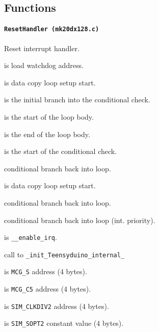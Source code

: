 \subsection{Functions}

\paragraph{\texttt{ResetHandler (mk20dx128.c)}} Reset interrupt handler.

 is load watchdog address.

\vspace{1em}

 is data copy loop setup start.

 is the initial branch into the conditional check.

 is the start of the loop body.

 is the end of the loop body.

 is the start of the conditional check.

 conditional branch back into loop.

\vspace{1em}

 is data copy loop setup start.

 conditional branch back into loop.

\vspace{1em}

 conditional branch back into loop (int. priority).

\vspace{1em}

 is \texttt{\_\_enable\_irq}.

 call to \texttt{\_init\_Teensyduino\_internal\_}

\vspace{1em}

 is \texttt{MCG\_S} address (4 bytes).

 is \texttt{MCG\_C5} address (4 bytes).

 is \texttt{SIM\_CLKDIV2} address (4 bytes).

 is \texttt{SIM\_SOPT2} constant value (4 bytes).

